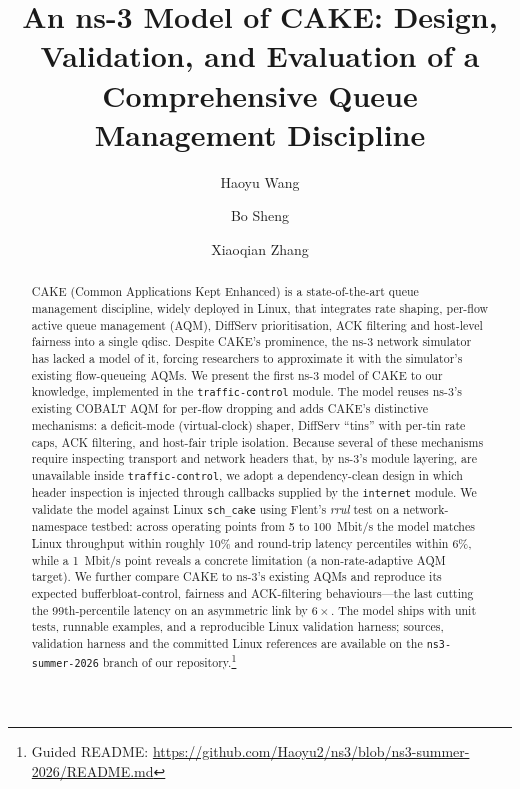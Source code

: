 \documentclass[sigconf,nonacm]{acmart}
\begin{document}
\title{An ns-3 Model of CAKE: Design, Validation, and Evaluation of a
Comprehensive Queue Management Discipline}

\author{Haoyu Wang}

\author{Bo Sheng}

\author{Xiaoqian Zhang}

\renewcommand{\shortauthors}{Wang et al.}

\begin{abstract}
CAKE (Common Applications Kept Enhanced) is a state-of-the-art queue management
discipline, widely deployed in Linux, that integrates rate shaping, per-flow
active queue management (AQM), DiffServ prioritisation, ACK filtering and
host-level fairness into a single qdisc. Despite CAKE's prominence, the ns-3
network simulator has lacked a model of it, forcing researchers to approximate
it with the simulator's existing flow-queueing AQMs. We present the first ns-3
model of CAKE to our knowledge, implemented in the \texttt{traffic-control} module. The model
reuses ns-3's existing COBALT AQM for per-flow dropping and adds CAKE's
distinctive mechanisms: a deficit-mode (virtual-clock) shaper, DiffServ
``tins'' with per-tin rate caps, ACK filtering, and host-fair triple isolation.
Because several of these mechanisms require inspecting transport and network
headers that, by ns-3's module layering, are unavailable inside
\texttt{traffic-control}, we adopt a dependency-clean design in which header
inspection is injected through callbacks supplied by the \texttt{internet}
module. We validate the model against Linux \texttt{sch\_cake} using Flent's
\emph{rrul} test on a network-namespace testbed: across operating points from
5 to 100~Mbit/s the model matches Linux throughput within roughly 10\% and
round-trip latency percentiles within 6\%, while a 1~Mbit/s point reveals a
concrete limitation (a non-rate-adaptive AQM target). We further compare CAKE to
ns-3's existing AQMs and reproduce its expected bufferbloat-control, fairness and
ACK-filtering behaviours---the last cutting the 99th-percentile latency on an
asymmetric link by $6\times$. The model ships with unit tests, runnable examples, and a
reproducible Linux validation harness; sources, validation harness and the
committed Linux references are available on the
\texttt{ns3-summer-2026} branch of our repository.\footnote{Guided README:
\url{https://github.com/Haoyu2/ns3/blob/ns3-summer-2026/README.md}}
\end{abstract}
\end{document}
